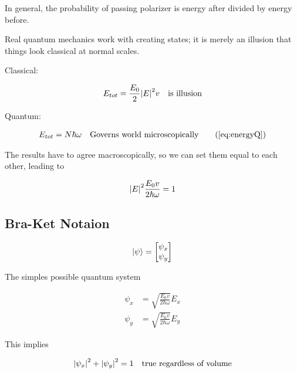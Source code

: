 In general, the probability of passing polarizer is energy after divided by energy before.

Real quantum mechanics work with creating states; it is merely an illusion that things look classical at normal scales.

Classical:

\begin{align}
  E_{tot} = \frac{E_0}{2}\abs{E}^2v &&\text{is illusion}
\end{align}

Quantum:

\begin{align}
  E_{tot} = N \hbar \omega &&\text{Governs world microscopically}\tag{\ref{eq:energyQ}}
\end{align}

The results have to agree macroscopically, so we can set them equal to each other, leading to

\begin{equation}
  \abs{E}^2 \frac{E_0v}{2\hbar\omega} = 1
\end{equation}

\subsection{Bra-Ket Notaion}

\begin{equation}
  \ket{\psi} = \begin{bmatrix}
                  \psi_x \\
                  \psi_y
                \end{bmatrix}
\end{equation}

The simples possible quantum system

\begin{align}
  \psi_x &= \sqrt{\frac{E_0v}{2\hbar\omega}} E_x \\
  \psi_y &= \sqrt{\frac{E_0v}{2\hbar\omega}} E_y
\end{align}

This implies

\begin{align}
  \abs{\psi_x}^2 + \abs{\psi_y}^2 = 1 && \text{true regardless of volume}
\end{align}
